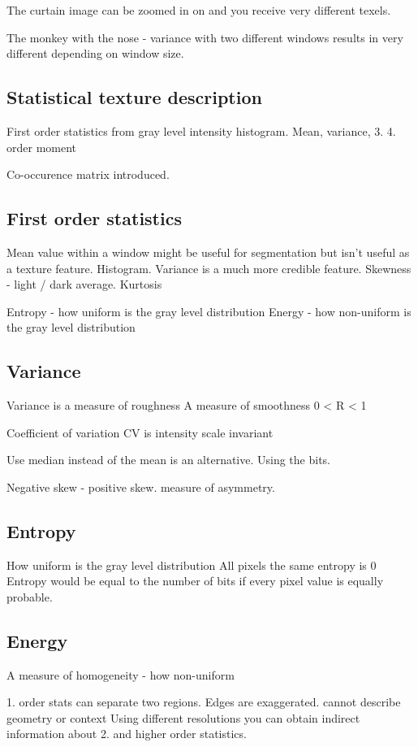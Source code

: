 \documentclass[a4paper,11pt]{article}
\begin{document}
	The curtain image can be zoomed in on and you receive very different texels.
	
	The monkey with the nose - variance with two different windows results in very different depending on window size.
	
	\subsection{Statistical texture description}
	First order statistics from gray level intensity histogram. Mean, variance, 3. 4. order moment
	
	Co-occurence matrix introduced.
	
	\subsection{First order statistics}
	Mean value within a window might be useful for segmentation but isn't useful as a texture feature. Histogram.
	Variance is a much more credible feature.
	Skewness - light / dark average.
	Kurtosis
	
	Entropy - how uniform is the gray level distribution
	Energy - how non-uniform is the gray level distribution
	
	\subsection{Variance}
	Variance is a measure of roughness
	A measure of smoothness 0 < R < 1
	
	Coefficient of variation
	CV is intensity scale invariant
	
	Use median instead of the mean is an alternative. Using the bits.
	
	Negative skew - positive skew. measure of asymmetry.
	
	\subsection{Entropy}
	How uniform is the gray level distribution
	All pixels the same entropy is 0
	Entropy would be equal to the number of bits if every pixel value is equally probable.
	
	\subsection{Energy}
	A measure of homogeneity - how non-uniform
	
	1. order stats can separate two regions. Edges are exaggerated. cannot describe geometry or context
	Using different resolutions you can obtain indirect information about 2. and higher order statistics.
	
\end{document}
